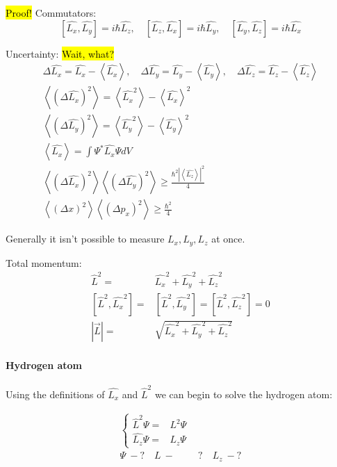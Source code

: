 			\hl{Proof!} Commutators:
			\begin{equation}
			\left[\hat{L_x}, \hat{L_y}\right] = i\hbar\hat{L_z}, \quad
			\left[\hat{L_z}, \hat{L_x}\right] = i\hbar\hat{L_y}, \quad
			\left[\hat{L_y}, \hat{L_z}\right] = i\hbar\hat{L_x}
			\end{equation}
			
			Uncertainty: \hl{Wait, what?}
			\begin{align}
				\Delta \hat{L_x} = \hat{L_x} - \left<\hat{L_x} \right>, \quad
				\Delta \hat{L_y} = \hat{L_y} - \left<\hat{L_y} \right>, \quad
				\Delta \hat{L_z} = \hat{L_z} - \left<\hat{L_z} \right> \\
				\left<(\Delta\hat{L_x})^2 \right> = \left<\hat{L_x}^2 \right> - \left<\hat{L_x} \right>^2 \\
				\left<(\Delta\hat{L_y})^2 \right> = \left<\hat{L_y}^2 \right> - \left<\hat{L_y} \right>^2 \\
				\left<\hat{L_x} \right> = \int \Psi^* \hat{L_x} \Psi dV \\ 
				\left<(\Delta\hat{L_x})^2 \right>\left<(\Delta\hat{L_y})^2 \right> \geq \frac{\hbar^2|\left<\hat{L_z}\right>|^2}{4} \\
				\left<(\Delta x)^2 \right>\left<(\Delta p_x)^2 \right> \geq \frac{\hbar^2}{4} \nonumber				
			\end{align}
			
			Generally it isn't possible to measure $L_x, L_y, L_z$ at once. 
			
			Total momentum:
			\begin{align}
				\hat{L}^2 =& \hat{L_x}^2 + \hat{L_y}^2 + \hat{L_z}^2 \\
				\left[\hat{L}^2, \hat{L_x}^2\right] =& \left[\hat{L}^2, \hat{L_y}^2\right] = \left[\hat{L}^2, \hat{L_z}^2\right] = 0 \\
				|\vec{L}| =& \sqrt{\hat{L_x}^2 + \hat{L_y}^2 + \hat{L_z}^2}								
			\end{align}
			
			\paragraph{Hydrogen atom}		
			Using the definitions of $\hat{L_x}$ and $\hat{L}^2$ we can begin to solve the hydrogen atom:
			
			\begin{align}
				\left\{ \begin{aligned}
					\hat{L}^2 \Psi =& L^2 \Psi \\
					\hat{L_z} \Psi =& L_z \Psi  
				\end{aligned} \right. \\
				\Psi~-? \quad L~-&? \quad L_z~-? \nonumber
				\label{hydrogensystem1}
			\end{align}
			
